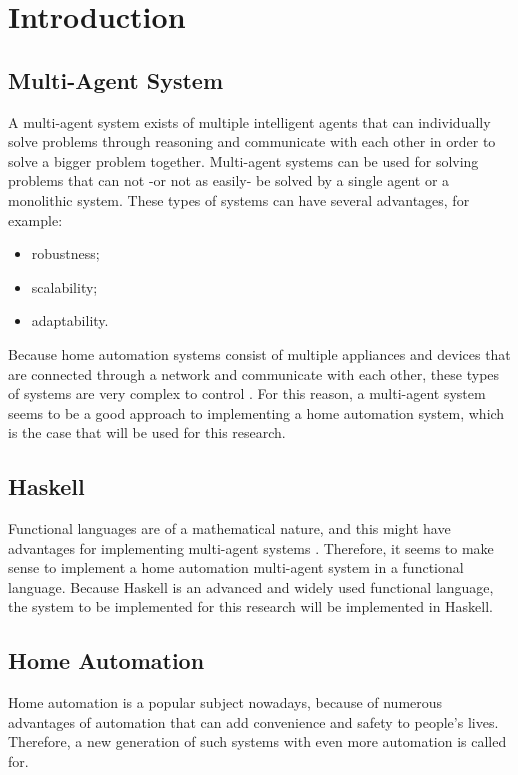\documentclass{sig-alternate-br}
\begin{document}


\section{Introduction}
\subsection{Multi-Agent System}
A multi-agent system exists of multiple intelligent agents that can individually solve problems through reasoning and communicate with each other in order to solve a bigger problem together. Multi-agent systems can be used for solving problems that can not -or not as easily- be solved by a single agent or a monolithic system. These types of systems can have several advantages, for example:
\begin{itemize}
\item robustness;
\item scalability;
\item adaptability.
\end{itemize}
Because home automation systems consist of multiple appliances and devices that are connected through a network and communicate with each other, these types of systems are very complex to control \cite{mast}. For this reason, a multi-agent system seems to be a good approach to implementing a home automation system, which is the case that will be used for this research.

\subsection{Haskell}
Functional languages are of a mathematical nature, and this might have advantages for implementing multi-agent systems \cite{dif}. Therefore, it seems to make sense to implement a home automation multi-agent system in a functional language. Because Haskell is an advanced and widely used functional language, the system to be implemented for this research will be implemented in Haskell.

\subsection{Home Automation}
Home automation is a popular subject nowadays, because of numerous advantages of automation that can add convenience and safety to people's lives. Therefore, a new generation of such systems with even more automation is called for.
\end{document}
